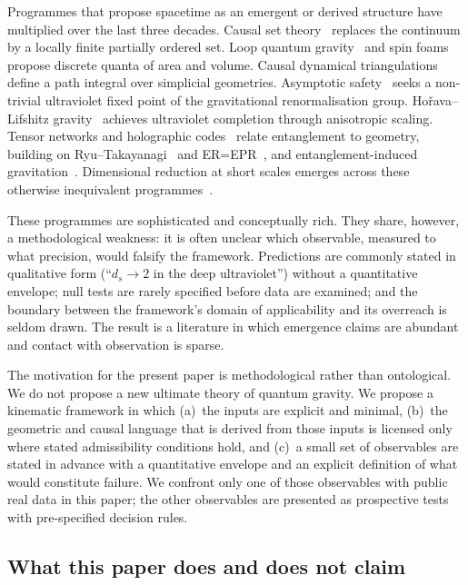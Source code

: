 ﻿\documentclass[12pt,a4paper]{article}
\theoremstyle{definition}
\begin{document}
Programmes that propose spacetime as an emergent or derived structure have multiplied over the last three decades. Causal set theory~\citep{sorkin,surya,henson,dowker,benincasa} replaces the continuum by a locally finite partially ordered set. Loop quantum gravity~\citep{rovelli,ashtekar,thiemann} and spin foams~\citep{perez} propose discrete quanta of area and volume. Causal dynamical triangulations~\citep{cdt,ambjorn2} define a path integral over simplicial geometries. Asymptotic safety~\citep{reuter,niedermaier,percacci,lauscher,rechenberger} seeks a non-trivial ultraviolet fixed point of the gravitational renormalisation group. Ho\v{r}ava--Lifshitz gravity~\citep{horava,horava2} achieves ultraviolet completion through anisotropic scaling. Tensor networks and holographic codes~\citep{swingle,pastawski} relate entanglement to geometry, building on Ryu--Takayanagi~\citep{ryu} and ER=EPR~\citep{maldacena}, and entanglement-induced gravitation~\citep{faulkner}. Dimensional reduction at short scales emerges across these otherwise inequivalent programmes~\citep{carlip,modesto,calcagni}.

These programmes are sophisticated and conceptually rich. They share, however, a methodological weakness: it is often unclear which observable, measured to what precision, would falsify the framework. Predictions are commonly stated in qualitative form (``$d_s \to 2$ in the deep ultraviolet'') without a quantitative envelope; null tests are rarely specified before data are examined; and the boundary between the framework's domain of applicability and its overreach is seldom drawn. The result is a literature in which emergence claims are abundant and contact with observation is sparse.

The motivation for the present paper is methodological rather than ontological. We do not propose a new ultimate theory of quantum gravity. We propose a kinematic framework in which (a)~the inputs are explicit and minimal, (b)~the geometric and causal language that is derived from those inputs is licensed only where stated admissibility conditions hold, and (c)~a small set of observables are stated in advance with a quantitative envelope and an explicit definition of what would constitute failure. We confront only one of those observables with public real data in this paper; the other observables are presented as prospective tests with pre-specified decision rules.

\subsection{What this paper does and does not claim}
\label{sec:intro_claims}
\end{document}
